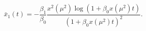 \begin{equation}%
\bar{x}_1 (t) = -\frac{\beta_1}{\beta_0} \frac{x^2(\mu^2) \log (1 +
\beta_0 x (\mu^2) t)}{(1 + \beta_0 x(\mu^2) t)^2}.
\end{equation}

